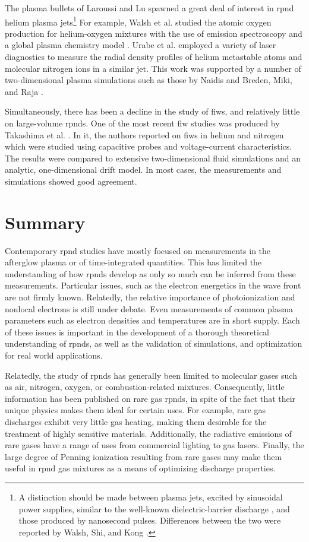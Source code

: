 The plasma bullets of Laroussi and Lu spawned a great deal of interest in
\acs{rpnd} helium plasma jets\footnote{A distinction should be made between
plasma jets, excited by sinusoidal power supplies, similar to the well-known
dielectric-barrier discharge \cite{Kogelschatz2003}, and those produced by
nanosecond pulses. Differences between the two were reported by Walsh, Shi, and
Kong \cite{Walsh2006}.} For example, Walsh et al. studied the atomic oxygen
production for helium-oxygen mixtures with the use of emission spectroscopy and
a global plasma chemistry model \cite{Walsh2010}. Urabe et al. employed a
variety of laser diagnostics to measure the radial density profiles of helium
metastable atoms and molecular nitrogen ions in a similar jet. This work was
supported by a number of two-dimensional plasma simulations such as those by
Naidis \cite{Naidis2010} and Breden, Miki, and Raja \cite{Breden2011}.

Simultaneously, there has been a decline in the study of \acs{fiw}s, and
relatively little on large-volume \acs{rpnd}s. One of the most recent \acs{fiw}
studies was produced by Takashima et al. \cite{Takashima2011}. In it, the
authors reported on \acs{fiw}s in helium and nitrogen which were studied using
capacitive probes and voltage-current characteristics. The results were compared
to extensive two-dimensional fluid simulations and an analytic, one-dimensional
drift model. In most cases, the measurements and simulations showed good
agreement.

\section{Summary}

Contemporary \acs{rpnd} studies have mostly focused on measurements in the
afterglow plasma or of time-integrated quantities. This has limited the
understanding of how \acs{rpnd}s develop as only so much can be inferred from
these measurements. Particular issues, such as the electron energetics in the
wave front are not firmly known. Relatedly, the relative importance of
photoionization and nonlocal electrons is still under debate. Even measurements
of common plasma parameters such as electron densities and temperatures are in
short supply. Each of these issues is important in the development of a thorough
theoretical understanding of \acs{rpnd}s, as well as the validation of
simulations, and optimization for real world applications.

Relatedly, the study of \acs{rpnd}s has generally been limited to molecular
gases such as air, nitrogen, oxygen, or combustion-related mixtures.
Consequently, little information has been published on rare gas \acs{rpnd}s, in
spite of the fact that their unique physics makes them ideal for certain uses.
For example, rare gas discharges exhibit very little gas heating, making them
desirable for the treatment of highly sensitive materials. Additionally, the
radiative emissions of rare gases have a range of uses from commercial lighting
to gas lasers. Finally, the large degree of Penning ionization resulting from
rare gases may make them useful in \acs{rpnd} gas mixtures as a means of
optimizing discharge properties.

